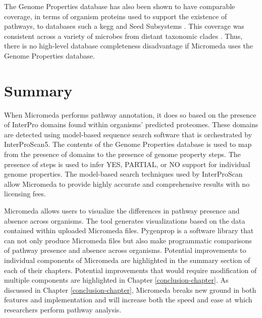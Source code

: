 The Genome Properties database has also been shown to have comparable coverage, 
in terms of organism proteins used to support the existence of pathways, to 
databases such a \gls{kegg} and Seed Subsystems \cite{richardson2018genome}. 
This coverage was consistent across a variety of microbes from distant taxonomic 
clades \cite{richardson2018genome}. Thus, there is no high-level database 
completeness disadvantage if Micromeda uses the Genome Properties database. 

\section{Summary} \label{introduction_summary}

When Micromeda performs pathway annotation, it does so based on the presence of 
InterPro domains found within organisms' predicted proteomes. These domains are 
detected using model-based sequence search software that is orchestrated by 
InterProScan5. The contents of the Genome Properties database is used to map 
from the presence of domains to the presence of genome property steps. The 
presence of steps is used to infer YES, PARTIAL, or NO support for individual 
genome properties. The model-based search techniques used by InterProScan allow 
Micromeda to provide highly accurate and comprehensive results with no licensing 
fees.

Micromeda allows users to visualize the differences in pathway presence and 
absence across organisms. The tool generates visualizations based on the data 
contained within uploaded Micromeda files. Pygenprop is a software library that 
can not only produce Micromeda files but also make programmatic comparisons of 
pathway presence and absence across organisms. Potential improvements to 
individual components of Micromeda are highlighted in the summary section of 
each of their chapters. Potential improvements that would require modification 
of multiple components are highlighted in Chapter \ref{conclusion-chapter}. As 
discussed in Chapter \ref{conclusion-chapter}, Micromeda breaks new ground in 
both features and implementation and will increase both the speed and ease at 
which researchers perform pathway analysis.
